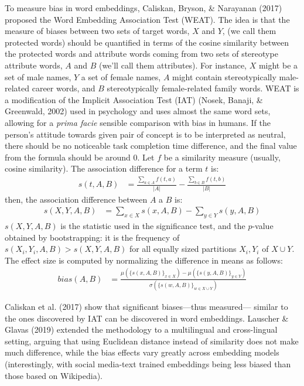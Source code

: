 \documentclass[
  10pt,
  dvipsnames,enabledeprecatedfontcommands, twocolumn]{scrartcl}
\begin{document}
To measure bias in word embeddings, Caliskan, Bryson, \& Narayanan
(2017) proposed the Word Embedding Association Test (WEAT). The idea is
that the measure of biases between two sets of target words, \(X\) and
\(Y\), (we call them protected words) should be quantified in terms of
the cosine similarity between the protected words and attribute words
coming from two sets of stereotype attribute words, \(A\) and \(B\)
(we'll call them attributes). For instance, \(X\) might be a set of male
names, \(Y\) a set of female names, \(A\) might contain stereotypically
male-related career words, and \(B\) stereotypically female-related
family words. WEAT is a modification of the Implicit Association Test
(IAT) (Nosek, Banaji, \& Greenwald, 2002) used in psychology and uses
almost the same word sets, allowing for a \emph{prima facie} sensible
comparison with bias in humans. If the person's attitude towards given
pair of concept is to be interpreted as neutral, there should be no
noticeable task completion time difference, and the final value from the
formula should be around 0. Let \(f\) be a similarity measure (usually,
cosine similarity). The association difference for a term \(t\) is:
\begin{align}
s(t,A,B) & = \frac{\sum_{a\in A}f(t,a)}{\vert A\vert} - \frac{\sum_{b\in B}f(t,b)}{\vert B\vert}
\end{align} \noindent then, the association difference between \(A\) a
\(B\) is: \begin{align}
s(X,Y,A,B) & = \sum_{x\in X} s(x,A,B) -  \sum_{y\in Y} s(y,A,B)
\end{align} \noindent \(s(X,Y,A,B)\) is the statistic used in the
significance test, and the \(p\)-value obtained by bootstrapping: it is
the frequency of \(s(X_i,Y_i,A,B)>s(X,Y,A,B)\) for all equally sized
partitions \(X_i, Y_i\) of \(X\cup Y\). The effect size is computed by
normalizing the difference in means as follows: \begin{align}
bias(A,B) & = \frac{
\mu(\{s(x,A,B)\}_{x\in X}) -\mu(\{s(y,A,B)\}_{y\in Y}) 
}{
\sigma(\{s(w,A,B)\}_{w\in X\cup Y})
}
\end{align}

Caliskan et al. (2017) show that significant biases---thus measured---
similar to the ones discovered by IAT can be discovered in word
embeddings. Lauscher \& Glavas (2019) extended the methodology to a
multilingual and cross-lingual setting, arguing that using Euclidean
distance instead of similarity does not make much difference, while the
bias effects vary greatly across embedding models (interestingly, with
social media-text trained embeddings being less biased than those based
on Wikipedia).
\end{document}
